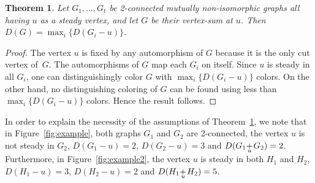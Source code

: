 \documentclass[12pt,a4paper, longbibliography]{article}
\newcommand\stackplus[1]{\makebox[0ex][l]{$+$} \raisebox{-.75ex}{\makebox[2ex]{$_{#1}$}}}
\newtheorem{theorem}{{\color{THM} Theorem}}[section]
\theoremstyle{definition}
\numberwithin{equation}{section}
\begin{document}
	
	\begin{theorem}\label{gdvsum}
		Let $G_1, \ldots, G_t$ be 2-connected mutually non-isomorphic graphs all having $u$ as a steady vertex, and let $G$ be their vertex-sum at  $u$.
		Then $D(G)=\max_i \{ D(G_i-u) \} $.
	\end{theorem}
	\begin{proof}
		The vertex $u$ is fixed by any automorphism of $G$ because it is the only cut vertex of~$G$. The automorphisms of $G$ map  each $G_i$ on itself. Since $u$ is steady in all $G_i$, one can distinguishingly color $G$ with $\max_i \{D(G_i-u)\}$ colors. On the other hand, no distinguishing coloring of $G$ can be found using less than  $\max_i \{D(G_i-u)\}$ colors. Hence the result follows.
	\end{proof}
	
	In order to explain the necessity  of the assumptions of Theorem~\ref{gdvsum}, we note that in Figure~\ref{fig:example}, both graphs $G_1$ and $G_2$ are 2-connected,  the vertex  $u$ is not steady in $G_2$, $D(G_1-u)=2$, $D(G_2-u)=3$ and $D(G_1\stackplus{u} G_2)=2$.
	Furthermore, in Figure~\ref{fig:example2}, the vertex  $u$ is steady in both $H_1$ and $H_2$, $D(H_1-u)=3$, $D(H_2-u)=2$  and $D(H_1\stackplus{u} H_2)=5$.
	
\end{document}
